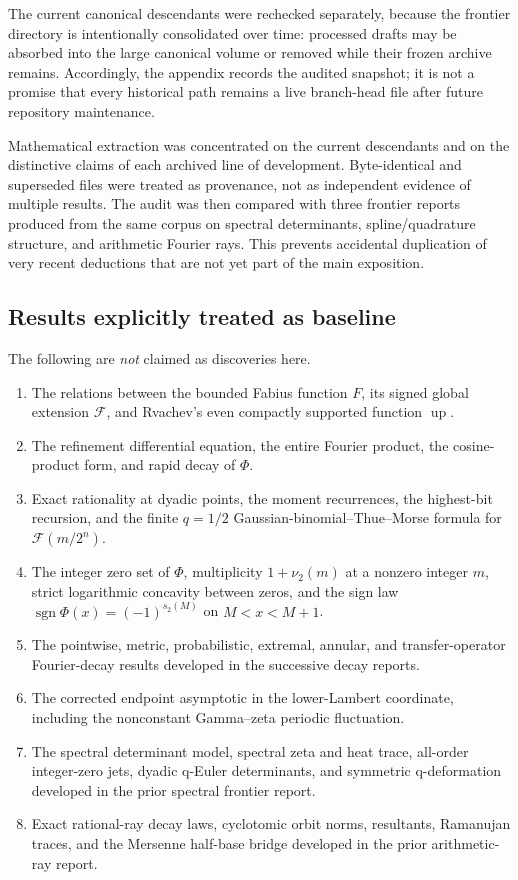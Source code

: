 \documentclass[11pt,oneside]{article}
\theoremstyle{definition}
\theoremstyle{remark}
\newcommand{\Up}{\operatorname{up}}
\newcommand{\GF}{\mathcal F}
\newcommand{\PhiU}{\Phi}
\begin{document}
The current canonical descendants were rechecked separately, because the
frontier directory is intentionally consolidated over time: processed drafts
may be absorbed into the large canonical volume or removed while their frozen
archive remains.  Accordingly, the appendix records the audited snapshot; it is
not a promise that every historical path remains a live branch-head file after
future repository maintenance.

Mathematical extraction was concentrated on the current descendants and on the
distinctive claims of each archived line of development.  Byte-identical and
superseded files were treated as provenance, not as independent evidence of
multiple results.  The audit was then compared with three frontier reports
produced from the same corpus on spectral determinants, spline/quadrature
structure, and arithmetic Fourier rays.  This prevents accidental duplication
of very recent deductions that are not yet part of the main exposition.

\subsection{Results explicitly treated as baseline}

The following are \emph{not} claimed as discoveries here.
\begin{enumerate}
 \item The relations between the bounded Fabius function $F$, its signed global
 extension $\GF$, and Rvachev's even compactly supported function $\Up$.
 \item The refinement differential equation, the entire Fourier product, the
 cosine-product form, and rapid decay of $\PhiU$.
 \item Exact rationality at dyadic points, the moment recurrences, the
 highest-bit recursion, and the finite $q=1/2$ Gaussian-binomial--Thue--Morse
 formula for $\GF(m/2^n)$.
 \item The integer zero set of $\PhiU$, multiplicity $1+\nu_2(m)$ at a nonzero
 integer $m$, strict logarithmic concavity between zeros, and the sign law
 $\operatorname{sgn}\PhiU(x)=(-1)^{s_2(M)}$ on $M<x<M+1$.
 \item The pointwise, metric, probabilistic, extremal, annular, and transfer-operator
 Fourier-decay results developed in the successive decay reports.
 \item The corrected endpoint asymptotic in the lower-Lambert coordinate,
 including the nonconstant Gamma--zeta periodic fluctuation.
 \item The spectral determinant model, spectral zeta and heat trace, all-order
 integer-zero jets, dyadic q-Euler determinants, and symmetric q-deformation
 developed in the prior spectral frontier report.
 \item Exact rational-ray decay laws, cyclotomic orbit norms, resultants,
 Ramanujan traces, and the Mersenne half-base bridge developed in the prior
 arithmetic-ray report.
\end{enumerate}
\end{document}

